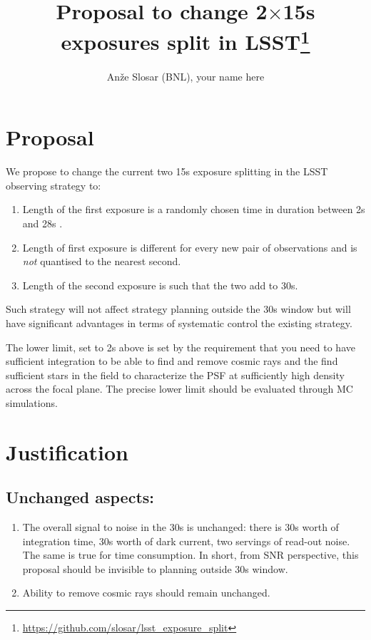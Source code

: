 \documentclass[12pt, a4paper]{article}
\begin{document}
\title{Proposal to change 2$\times$15s exposures split in LSST\thanks{\url{https://github.com/slosar/lsst_exposure_split}}}
\author{An\v{z}e Slosar (BNL), your name here }



\maketitle

\section*{Proposal}

We propose to change the current two 15s exposure splitting in the
LSST observing strategy to:

\begin{enumerate}
\item Length of the first exposure is a randomly chosen time in
  duration between 2s and 28s .

\item Length of first exposure is different for every new pair of
  observations and is \emph{not} quantised to the nearest second.

\item Length of the second exposure is such that the two add to 30s.
\end{enumerate}

Such strategy will not affect strategy planning outside the 30s window
but will have significant advantages in terms of systematic control
the existing strategy.

The lower limit, set to 2s above is set by the requirement that you
need to have sufficient integration to be able to find and remove
cosmic rays and the find sufficient stars in the field to characterize
the PSF at sufficiently high density across the focal plane. The
precise lower limit should be evaluated through MC simulations. 




\section*{Justification}

\subsection*{Unchanged aspects:}
\begin{enumerate}

\item The overall signal to noise in the 30s is unchanged: there is
  30s worth of integration time, 30s worth of dark current, two servings
  of read-out noise. The same is true for time consumption. In short,
  from SNR perspective, this proposal should be invisible to planning
  outside 30s window.

\item Ability to remove cosmic rays should remain unchanged.
\end{enumerate}
\end{document}
